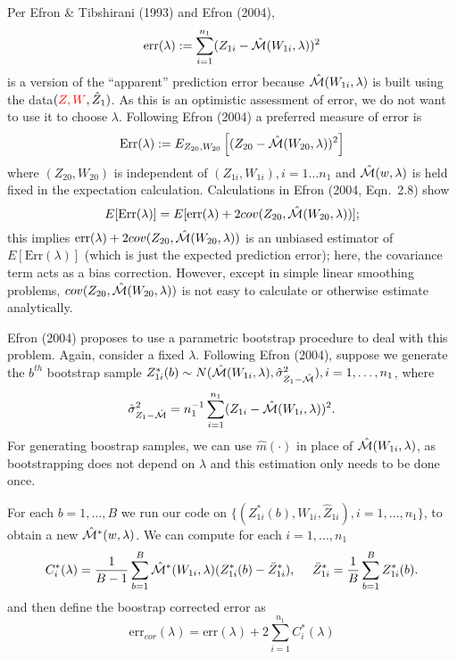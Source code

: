\documentclass[12pt]{article}
\begin{document}
Per Efron \& Tibshirani (1993) and Efron (2004), 
\[
\mbox{err}(\lambda) := \sum_{i=1}^{n_1} ( Z_{1i} - \hat{\cal M}(W_{1i},\lambda))^2
\]
is a version of the ``apparent'' prediction error because
$\hat{\cal M}(W_{1i},\lambda)$ is built using the data$(\textcolor{red}{Z, W}, \hat Z_{1})$. As this is an optimistic assessment of
error, we do not want to use it to choose $\lambda$.  Following
Efron (2004) a preferred measure of error is
\[
\mbox{Err}(\lambda) := 
E_{Z_{20},W_{20}}\left[ (Z_{20} - \hat{\cal M}(W_{20},\lambda))^2 \right]
\]
where $(Z_{20},W_{20})$ is independent of 
$(Z_{1i}, W_{1i}), i = 1 \ldots n_1$ and 
$\hat{\cal M}(w,\lambda)$ is held fixed in the expectation
calculation.
Calculations in Efron (2004, Eqn.\ 2.8) show
\[
E[ \mbox{Err}(\lambda) ]
= E[ \mbox{err}(\lambda) + 2 cov(Z_{20},\hat{\cal M}(W_{20},\lambda))];
\]
this implies $\mbox{err}(\lambda) + 2
cov(Z_{20},\hat{\cal M}(W_{20},\lambda))$ is an unbiased estimator of $E[
  \mbox{Err}(\lambda) ]$ (which is just the expected prediction
error); here, the covariance term acts as a bias correction. However,
except in simple linear smoothing problems,
$cov(Z_{20},\hat{\cal M}(W_{20},\lambda))$ is not easy to calculate or
otherwise estimate analytically.

Efron (2004) proposes to use a parametric bootstrap procedure to deal
with this problem. Again, consider a fixed $\lambda$.  Following Efron
(2004), suppose we generate the $b^{th}$ bootstrap sample $Z_{1i}^*(b)
\sim N( \hat {\cal M}(W_{1i},\lambda), \hat \sigma^2_{Z_1-\hat{\cal M}} ), i = 1, \ldots, n_1$,
where
\begin{equation}
	\label{sigma_z1_calM}
	\hat \sigma^2_{Z_1-\hat{\cal M}} = n_1^{-1} \sum_{i=1}^{n_1} (Z_{1i}-\hat {\cal M}(W_{1i},\lambda))^2.
\end{equation}
For generating boostrap samples,  we can use $\hat m(\cdot)$ in place of $\hat {\cal M}(W_{1i},\lambda)$, as
bootstrapping does not depend on $\lambda$ and this estimation only needs to be done
once. 

For each $b = 1,\ldots,B$ we run our code on $\{(Z^*_{1i}(b), W_{1i}, \hat Z_{1i}),
i=1,\ldots,n_1\}$, to obtain a new $\hat {\cal M}^*(w,\lambda)$.  We can
compute for each $i=1,\ldots,n_1$
\begin{equation}
	C^*_i(\lambda) = \frac{1}{B-1} \sum_{b=1}^B \hat {\cal M}^*(W_{1i},\lambda)
	(Z^*_{1i}(b) - \bar Z^*_{1i}), 
	~~~~\bar Z^*_{1i} = \frac{1}{B} \sum_{b=1}^B Z^*_{1i}(b).
\end{equation}
and then define the boostrap corrected error as
\begin{equation}
  \label{optcor}
  \mbox{err}_{cor}(\lambda)  = \mbox{err}(\lambda) + 2 \sum_{i=1}^{n_1} C^*_i(\lambda)
\end{equation}
\end{document}
